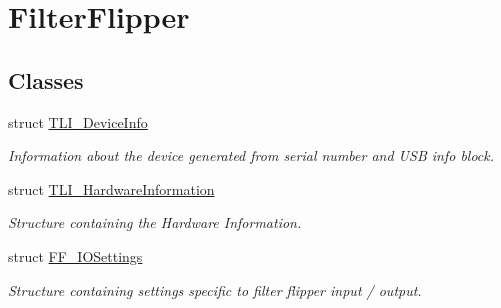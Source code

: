 \hypertarget{group___filter_flipper}{}\section{Filter\+Flipper}
\label{group___filter_flipper}
\subsection*{Classes}
\begin{DoxyCompactItemize}
\item 
struct \hyperlink{struct_t_l_i___device_info}{T\+L\+I\+\_\+\+Device\+Info}
\begin{DoxyCompactList}\small\item\em Information about the device generated from serial number and U\+SB info block. \end{DoxyCompactList}\item 
struct \hyperlink{struct_t_l_i___hardware_information}{T\+L\+I\+\_\+\+Hardware\+Information}
\begin{DoxyCompactList}\small\item\em Structure containing the Hardware Information. \end{DoxyCompactList}\item 
struct \hyperlink{struct_f_f___i_o_settings}{F\+F\+\_\+\+I\+O\+Settings}
\begin{DoxyCompactList}\small\item\em Structure containing settings specific to filter flipper input / output. \end{DoxyCompactList}\end{DoxyCompactItemize}
